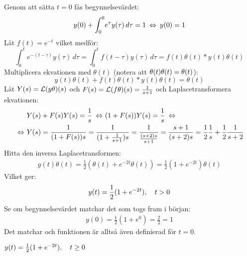 \pagebreak
\begin{task}{6.11}
	Genom att sätta $t=0$ fås begynnelsevärdet:
	\[y(0)+\int_{0}^{0}\!e^{\tau}y(\tau)\,d\tau=1 \lra
	y(0)=1\]
	Låt $f(t)=e^{-t}$ vilket medför:
	\[\int_{0}^{t}\!e^{-(t-\tau)}y(\tau)\,d\tau=
	\int_{0}^{t}\!f(t-\tau)y(\tau)\,d\tau=
	f(t)\theta(t)*y(t)\theta(t)\]
	Multiplicera ekvationen med $\theta(t)$ (notera att $\theta(t)\*\theta(t)=\theta(t)$):
	\[y(t)\theta(t)+f(t)\theta(t)*y(t)\theta(t)=\theta(t)\]
	Låt $Y(s)=\operatorname{\mathcal{L}}(y\theta)(s)$ och $F(s)=\operatorname{\mathcal{L}}(f\theta)(s)=\frac{1}{s+1}$ och Laplacetransformera ekvationen:
	\begin{align*}
	&Y(s)+F(s)\*Y(s)=\frac{1}{s} \lra
	(1+F(s))Y(s)=\frac{1}{s} \lra \\ \lra
	&Y(s)=
	\frac{1}{(1+F(s))s}=
	\frac{1}{(1+\frac{1}{s+1})s}=
	\frac{1}{\frac{(s+2)s}{s+1}}=
	\frac{s+1}{(s+2)s}=
	\frac{1}{2}\*\frac{1}{s}+\frac{1}{2}\*\frac{1}{s+2}
	\end{align*}
	Hitta den inversa Laplacetransformen:
	\begin{align*}
	y(t)\theta(t)=\frac{1}{2}(\theta(t)+e^{-2t}\theta(t))=\frac{1}{2}(1+e^{-2t})\theta(t)
	\end{align*}
	Vilket ger:
	\begin{align*}
	y(t)=\frac{1}{2}(1+e^{-2t}), \quad t>0
	\end{align*}
	Se om begynnelsevärdet matchar det som togs fram i början:
	\begin{align*}
	y(0)=\frac{1}{2}(1+e^{0})=\frac{2}{2}=1
	\end{align*}
	Det matchar och funktionen är alltså även definierad för $t=0$.
	
	\ans $y(t)=\frac{1}{2}(1+e^{-2t}), \quad t\ge0$
\end{task}